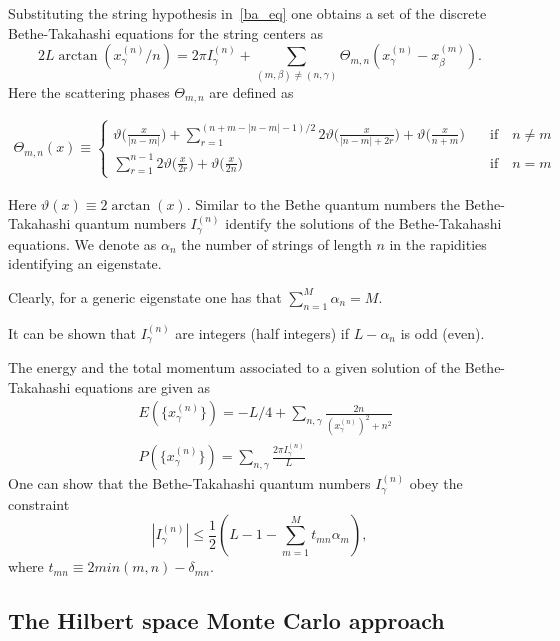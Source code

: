 \documentclass[twocolumn,superscriptaddress,prb,10pt]{revtex4-1}
\begin{document}
Substituting the string hypothesis in~\eqref{ba_eq} one obtains a set of 
the discrete Bethe-Takahashi equations for the string centers as 
%
\begin{equation}
2L\arctan(x_\gamma^{(n)}/n)=2\pi I_\gamma^{(n)}+\sum\limits_{(m,\beta)
\ne(n,\gamma)}\Theta_{m,n}(x_\gamma^{(n)}-x_\beta^{(m)}).
\label{bt-eq}
\end{equation}
%
Here the scattering phases $\Theta_{m,n}$ are defined as 
%
\begin{widetext}
\begin{eqnarray}
\nonumber\Theta_{m,n}(x)\equiv\left\{\begin{array}{cc}
\vartheta\big(\frac{x}{|n-m|}\big)+\!\!\!\!\!\sum
\limits_{r=1}^{(n+m-|n-m|-1)/2}\!\!\!\!\!2\vartheta\big(\frac{x}
{|n-m|+2r}\big)+\vartheta\big(\frac{x}{n+m}\big) & \quad\mbox{if}
\quad n\ne m\\\sum\limits_{r=1}^{n-1}2\vartheta\big(\frac{x}{2r}\big)+
\vartheta\big(\frac{x}{2n}\big) & \quad\mbox{if}\quad n=m
\end{array}\right.
\end{eqnarray}
\end{widetext}
%
Here $\vartheta(x)\equiv 2\arctan(x)$. Similar to the Bethe quantum numbers 
the Bethe-Takahashi quantum numbers $I_{\gamma}^{(n)}$ identify the solutions 
of the Bethe-Takahashi equations. We denote as $\alpha_n$ the number of 
strings of length $n$ in the rapidities identifying an eigenstate. 

Clearly, for a generic eigenstate one has that $\sum_{n=1}^M\alpha_n=M$. 

It can be shown that $I_\gamma^{(n)}$ are integers (half integers) if 
$L-\alpha_n$ is odd (even). 

The energy and the total momentum associated to a given solution of the 
Bethe-Takahashi equations are given as 
%
\begin{align}
& E(\{x_\gamma^{(n)}\})=-L/4+\sum\limits_{n,\gamma}\frac{2n}{
(x_\gamma^{(n)})^2+n^2}\\
& P(\{x_\gamma^{(n)}\})=\sum\limits_{n,\gamma}\frac{2\pi 
I_\gamma^{(n)}}{L}
\end{align}
%
One can show that the Bethe-Takahashi quantum numbers $I_\gamma^{(n)}$ obey 
the constraint 
%
\begin{equation}
|I_\gamma^{(n)}|\le\frac{1}{2}(L-1-\sum\limits_{m=1}^Mt_{mn}\alpha_m),
\end{equation}
%
where $t_{mn}\equiv 2 min(m,n)-\delta_{mn}$. 

\subsection{The Hilbert space Monte Carlo approach}
\end{document}
